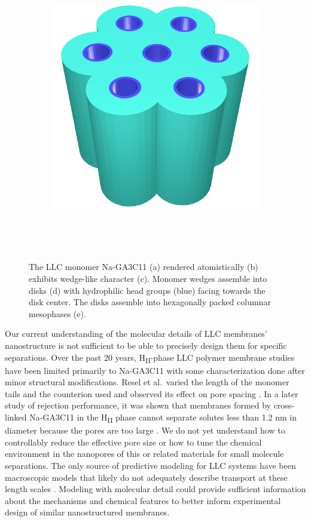 \documentclass[journal=jpcbfk,manuscript=article]{achemso}
\begin{document}
\begin{figure}
\begin{subfigure}{0.4\linewidth}
		\caption{}~\label{fig:wedge_layer}
	\end{subfigure}
	\begin{subfigure}{0.4\linewidth}
		\centering
		\includegraphics[width=\textwidth]{hexagonal_packing.png}
		\caption{}~\label{fig:hex_packing_simple}
	\end{subfigure}
	\caption{The LLC monomer Na-GA3C11 (a) rendered atomistically (b)
	exhibits wedge-like character (c). Monomer wedges assemble into disks (d) with
	hydrophilic head groups (blue) facing towards the disk center. The disks
	assemble into hexagonally packed columnar mesophases (e).}~\label{fig:assembly}
  \end{figure}

  Our current understanding of the molecular details of LLC membranes' nanostructure
  is not sufficient to be able to precisely design them for specific separations. 
  Over the past 20 years, H\textsubscript{II}-phase LLC polymer membrane studies have
  been limited primarily to Na-GA3C11 with some characterization done after minor 
  structural modifications. Resel et al.~varied the length of the monomer tails and the
  counterion used and observed its effect on pore spacing \cite{resel_structural_2000}.
  In a later study of rejection performance, it was shown that membranes formed by cross-
  linked Na-GA3C11 in the H\textsubscript{II} phase cannot separate solutes less than 1.2 
  nm in diameter because the pores are too large \cite{zhou_supported_2005}. We do not
  yet understand how to controllably reduce the effective pore size or how to tune
  the chemical environment in the nanopores of this or related materials for
  small molecule separations. The only source of predictive modeling for LLC
  systems have been macroscopic models that likely do not adequately describe
  transport at these length scales \cite{hatakeyama_water_2011}. Modeling with molecular
  detail could provide sufficient information about the mechanisms and chemical features
  to better inform experimental design of similar nanostructured membranes. 
\end{document}
